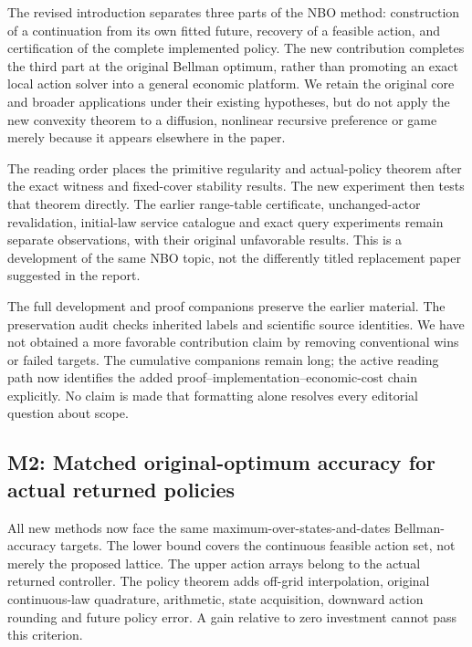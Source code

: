 The revised introduction separates three parts of the NBO method:
construction of a continuation from its own fitted future, recovery of a
feasible action, and certification of the complete implemented policy.
The new contribution completes the third part at the original Bellman
optimum, rather than promoting an exact local action solver into a
general economic platform. We retain the original core and broader
applications under their existing hypotheses, but do not apply the new
convexity theorem to a diffusion, nonlinear recursive preference or game
merely because it appears elsewhere in the paper.

The reading order places the primitive regularity and actual-policy
theorem after the exact witness and fixed-cover stability results. The
new experiment then tests that theorem directly. The earlier range-table
certificate, unchanged-actor revalidation, initial-law service catalogue
and exact query experiments remain separate observations, with their
original unfavorable results. This is a development of the same NBO
topic, not the differently titled replacement paper suggested in the
report.

The full development and proof companions preserve the earlier material.
The preservation audit checks inherited labels and scientific source
identities. We have not obtained a more favorable contribution claim by
removing conventional wins or failed targets. The cumulative companions
remain long; the active reading path now identifies the added
proof--implementation--economic-cost chain explicitly. No claim is made
that formatting alone resolves every editorial question about scope.

\hypertarget{m2-matched-original-optimum-accuracy-for-actual-returned-policies}{%
\subsection{M2: Matched original-optimum accuracy for actual returned
policies}\label{m2-matched-original-optimum-accuracy-for-actual-returned-policies}}

All new methods now face the same maximum-over-states-and-dates
Bellman-accuracy targets. The lower bound covers the continuous feasible
action set, not merely the proposed lattice. The upper action arrays
belong to the actual returned controller. The policy theorem adds
off-grid interpolation, original continuous-law quadrature, arithmetic,
state acquisition, downward action rounding and future policy error. A
gain relative to zero investment cannot pass this criterion.

